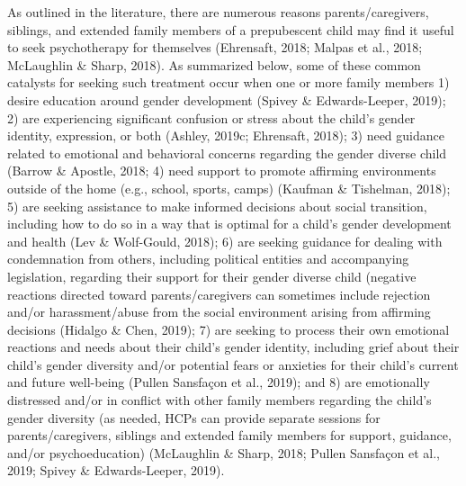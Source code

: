 \documentclass[
]{book}
\begin{document}
As outlined in the literature, there are numerous reasons parents/caregivers, siblings, and
extended family members of a prepubescent child
may find it useful to seek psychotherapy for
themselves (Ehrensaft, 2018; Malpas et al., 2018;
McLaughlin \& Sharp, 2018). As summarized
below, some of these common catalysts for seeking such treatment occur when one or more family members 1) desire education around gender
development (Spivey \& Edwards-Leeper, 2019);
2) are experiencing significant confusion or stress
about the child's gender identity, expression, or
both (Ashley, 2019c; Ehrensaft, 2018); 3) need
guidance related to emotional and behavioral
concerns regarding the gender diverse child
(Barrow \& Apostle, 2018; 4) need support to
promote affirming environments outside of the
home (e.g., school, sports, camps) (Kaufman \&
Tishelman, 2018); 5) are seeking assistance to
make informed decisions about social transition,
including how to do so in a way that is optimal
for a child's gender development and health (Lev
\& Wolf-Gould, 2018); 6) are seeking guidance
for dealing with condemnation from others,
including political entities and accompanying legislation, regarding their support for their gender
diverse child (negative reactions directed toward
parents/caregivers can sometimes include rejection and/or harassment/abuse from the social
environment arising from affirming decisions
(Hidalgo \& Chen, 2019); 7) are seeking to process
their own emotional reactions and needs about
their child's gender identity, including grief about
their child's gender diversity and/or potential
fears or anxieties for their child's current and
future well-being (Pullen Sansfaçon et al., 2019);
and 8) are emotionally distressed and/or in conflict with other family members regarding the
child's gender diversity (as needed, HCPs can
provide separate sessions for parents/caregivers,
siblings and extended family members for support, guidance, and/or psychoeducation)
(McLaughlin \& Sharp, 2018; Pullen Sansfaçon
et al., 2019; Spivey \& Edwards-Leeper, 2019).
\end{document}
